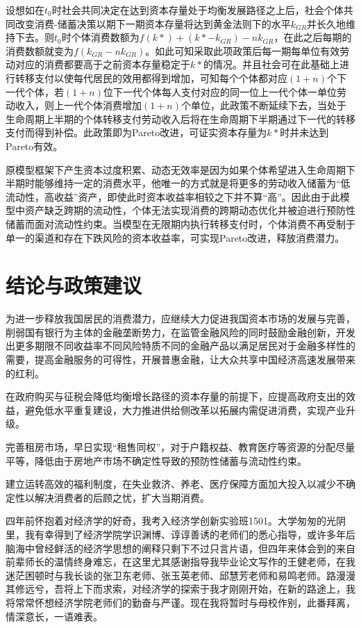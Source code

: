 \documentclass[supercite]{HustGraduPaper}
\begin{document}
    设想如在$t_0$时社会共同决定在达到资本存量处于均衡发展路径之上后，社会个体共同改变消费-储蓄决策以期下一期资本存量将达到黄金法则下的水平$k_{GR}$并长久地维持下去。则$t_0$时个体消费数额为$f(k*)+(k*-k_{GR})-nk_{GR}$，在此之后每期的消费数额就变为$f(k_{GR}-nk_{GR})$。如此可知采取此项政策后每一期每单位有效劳动对应的消费都要高于之前资本存量稳定于$k*$的情况。并且社会可在此基础上进行转移支付以使每代居民的效用都得到增加，可知每个个体都对应$(1+n)$个下一代个体，若$(1+n)$位下一代个体每人支付对应的同一位上一代个体一单位劳动收入，则上一代个体消费增加$(1+n)$个单位，此政策不断延续下去，当处于生命周期上半期的个体转移支付劳动收入后将在生命周期下半期通过下一代的转移支付而得到补偿。此政策即为Pareto改进，可证实资本存量为$k*$时并未达到Pareto有效。

    原模型框架下产生资本过度积累、动态无效率是因为如果个体希望进入生命周期下半期时能够维持一定的消费水平，他唯一的方式就是将更多的劳动收入储蓄为“低流动性，高收益”资产，即使此时资本收益率相较之下并不算“高”。因此由于此模型中资产缺乏跨期的流动性，个体无法实现消费的跨期动态优化并被迫进行预防性储蓄而面对流动性约束。当模型在无限期内执行转移支付时，个体消费不再受制于单一的渠道和存在下跌风险的资本收益率，可实现Pareto改进，释放消费潜力。
    
    \section{结论与政策建议}
    为进一步释放我国居民的消费潜力，应继续大力促进我国资本市场的发展与完善，削弱国有银行为主体的金融垄断势力，在监管金融风险的同时鼓励金融创新，开发出更多期限不同收益率不同风险特质不同的金融产品以满足居民对于金融多样性的需要，提高金融服务的可得性，开展普惠金融，让大众共享中国经济高速发展带来的红利。

    在政府购买与征税会降低均衡增长路径的资本存量的前提下，应提高政府支出的效益，避免低水平重复建设，大力推进供给侧改革以拓展内需促进消费，实现产业升级。

    完善租房市场，早日实现“租售同权”，对于户籍权益、教育医疗等资源的分配尽量平等，降低由于房地产市场不确定性导致的预防性储蓄与流动性约束。

    建立运转高效的福利制度，在失业救济、养老、医疗保障方面加大投入以减少不确定性以解决消费者的后顾之忧，扩大当期消费。

    
    
    
    \begin{thankpage}
    四年前怀抱着对经济学的好奇，我考入经济学创新实验班1501。大学匆匆的光阴里，我有幸得到了经济学院学识渊博、谆谆善诱的老师们的悉心指导，或许多年后脑海中曾经鲜活的经济学思想的阐释只剩下不过只言片语，但四年来体会到的来自前辈师长的温情终身难忘，在这里尤其感谢指导我毕业论文写作的王健老师，在我迷茫困顿时与我长谈的张卫东老师、张玉英老师、邱慧芳老师和易鸣老师。路漫漫其修远兮，吾将上下而求索，对经济学的探索于我才刚刚开始，在新的路途上，我将常常怀想经济学院老师们的勤奋与严谨。现在我将暂时与母校作别，此番拜离，情深意长，一语难表。
    \end{thankpage}
\end{document}
